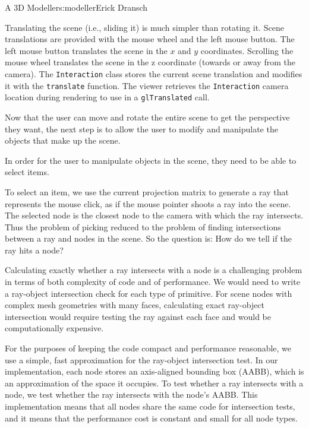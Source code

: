\begin{aosachapter}{A 3D Modeller}{s:modeller}{Erick Dransch}
\label{translating-the-scene}

Translating the scene (i.e., sliding it) is much simpler than rotating
it. Scene translations are provided with the mouse wheel and the left
mouse button. The left mouse button translates the scene in the $x$ and
$y$ coordinates. Scrolling the mouse wheel translates the scene in the z
coordinate (towards or away from the camera). The \texttt{Interaction}
class stores the current scene translation and modifies it with the
\texttt{translate} function. The viewer retrieves the
\texttt{Interaction} camera location during rendering to use in a
\texttt{glTranslated} call.

\label{selecting-scene-objects}

Now that the user can move and rotate the entire scene to get the
perspective they want, the next step is to allow the user to modify and
manipulate the objects that make up the scene.

In order for the user to manipulate objects in the scene, they need to
be able to select items.

To select an item, we use the current projection matrix to generate a
ray that represents the mouse click, as if the mouse pointer shoots a
ray into the scene. The selected node is the closest node to the camera
with which the ray intersects. Thus the problem of picking reduced to
the problem of finding intersections between a ray and nodes in the
scene. So the question is: How do we tell if the ray hits a node?

Calculating exactly whether a ray intersects with a node is a
challenging problem in terms of both complexity of code and of
performance. We would need to write a ray-object intersection check for
each type of primitive. For scene nodes with complex mesh geometries
with many faces, calculating exact ray-object intersection would require
testing the ray against each face and would be computationally
expensive.

For the purposes of keeping the code compact and performance reasonable,
we use a simple, fast approximation for the ray-object intersection
test. In our implementation, each node stores an axis-aligned bounding
box (AABB), which is an approximation of the space it occupies. To test
whether a ray intersects with a node, we test whether the ray intersects
with the node's AABB. This implementation means that all nodes share the
same code for intersection tests, and it means that the performance cost
is constant and small for all node types.


\end{aosachapter}
